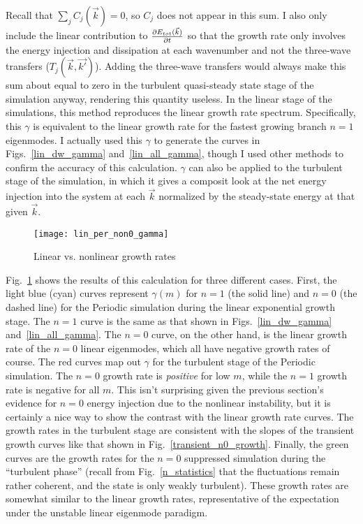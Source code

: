 Recall that $\sum_j C_j(\vec{k}) = 0$, so $C_j$ does not appear in this sum. I also only include the linear contribution to $ \frac{\partial E_{tot}({\vec{k}})}{\partial t}$ so that the growth rate
only involves the energy injection and dissipation at each wavenumber and not the three-wave transfers ($T_j(\vec{k},\vec{k'})$). 
Adding the three-wave transfers would always make this sum about equal to zero in the turbulent
quasi-steady state stage of the simulation anyway, rendering this quantity useless. 
In the linear stage of the simulations, this method reproduces the linear growth rate spectrum.
Specifically, this $\gamma$ is equivalent to the linear growth rate for the fastest growing branch $n=1$ eigenmodes.
I actually used this $\gamma$ to generate the curves in Figs.~\ref{lin_dw_gamma} and~\ref{lin_all_gamma}, though I used other methods to confirm the accuracy of this calculation.
$\gamma$ can also be applied to the turbulent stage of the simulation, in which it gives a composit look at the net energy injection into the system at each $\vec{k}$ normalized
by the steady-state energy at that given $\vec{k}$.

\begin{figure}[!ht]
\centerline{\texttt{[image: lin\_per\_non0\_gamma]}}
\caption{Linear vs. nonlinear growth rates}
\label{lin_per_non0_gamma}
\end{figure}

Fig.~\ref{lin_per_non0_gamma} shows the results of this calculation for three different cases. First, the light blue (cyan) curves represent $\gamma(m)$ for $n=1$ (the solid line)
and $n=0$ (the dashed line) for the Periodic simulation during the linear exponential growth stage. The $n=1$ curve is the same as that shown in Figs.~\ref{lin_dw_gamma} and~\ref{lin_all_gamma}.
The $n=0$ curve, on the other hand, is the linear growth rate of the $n=0$ linear eigenmodes, which all have negative growth rates of course. The red curves map out $\gamma$ for the 
turbulent stage of the Periodic simulation. The $n=0$ growth rate is \emph{positive} for low $m$, while the $n=1$ growth rate is negative for all $m$. This isn't surprising given the
previous section's evidence for $n=0$ energy injection due to the nonlinear instability, but it is certainly a nice way to show the contrast with the linear growth rate curves.
The growth rates in the turbulent stage are consistent with the slopes of the transient growth curves like that shown in Fig.~\ref{transient_n0_growth}.
Finally, the green curves are the growth rates for the $n=0$ suppressed simulation during the ``turbulent phase'' (recall from Fig.~\ref{n_statistics} that the fluctuations remain rather
coherent, and the state is only weakly turbulent). 
These growth rates are somewhat similar to the linear growth rates, representative of the expectation under the unstable linear eigenmode paradigm. 

